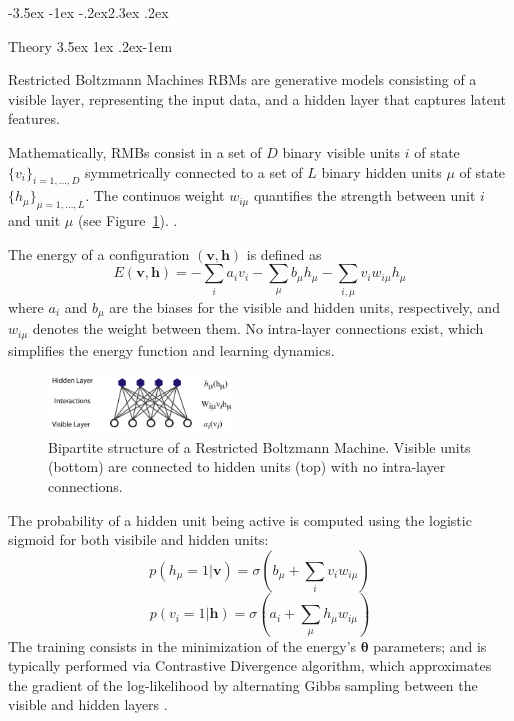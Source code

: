 \documentclass[prl,twocolumn]{revtex4-1}
\makeatletter
\renewcommand{\section}{\@startsection{section}{1}{\z@}%
    {-3.5ex \@plus -1ex \@minus -.2ex}{2.3ex \@plus.2ex}%
    {\normalfont\bfseries\raggedright}}
\renewcommand{\subsection}{\@startsection{subsection}{2}{\z@}%
    {3.5ex \@plus 1ex \@minus .2ex}{-1em}%
    {\normalfont\bfseries\raggedright}}
\makeatother
\begin{document}
\section{Theory}
\label{sec:theory}
\subsection{Restricted Boltzmann Machines}
RBMs are generative models consisting of a visible layer, representing the input data, and a hidden layer that captures latent features.

Mathematically, RMBs consist in a set of $D$ binary visible units $i$ of state $\{v_i\}_{i=1, ..., D}$ symmetrically connected to a set of $L$ binary hidden units $\mu$ of state $\{h_\mu\}_{\mu=1, ..., L}$. The continuos weight $w_{i\mu}$ quantifies the strength between unit $i$ and unit $\mu$ (see Figure~\ref{fig:rbm_model}). \cite{intro_ML,bortoletto}. 

The energy of a configuration $(\mathbf{v},\mathbf{h})$ is defined as
\begin{equation}
	E(\mathbf{v},\mathbf{h}) = -\sum_{i} a_i v_i - \sum_{\mu} b_\mu h_\mu - \sum_{i,\mu} v_i w_{i\mu} h_\mu
\end{equation}
where $a_i$ and $b_\mu$ are the biases for the visible and hidden units, respectively, and $w_{i\mu}$ denotes the weight between them. No intra-layer connections exist, which simplifies the energy function and learning dynamics. 

\begin{figure}[!tb]
	\includegraphics[width=0.44\textwidth]{RBM_structure.png}
	\caption{Bipartite structure of a Restricted Boltzmann Machine. Visible units (bottom) are connected to hidden units (top) with no intra-layer connections.}
	\label{fig:rbm_model}
\end{figure}

The probability of a hidden unit being active is computed using the logistic sigmoid for both visibile and hidden units:
\begin{equation}
	p(h_\mu=1|\mathbf{v}) = \sigma\left(b_\mu+\sum_{i}v_iw_{i\mu}\right)
	\label{eq:p_of_h}
\end{equation}
\begin{equation}
	p(v_i=1|\mathbf{h}) = \sigma\left(a_i+\sum_{\mu}h_\mu w_{i\mu}\right)
	\label{eq:p_of_v}
\end{equation}
The training consists in the minimization of the energy's $\boldsymbol{\theta}$ parameters; and is typically performed via Contrastive Divergence algorithm, which approximates the gradient of the log-likelihood by alternating Gibbs sampling between the visible and hidden layers \cite{bortoletto,practical,intro_ML}.
\end{document}
